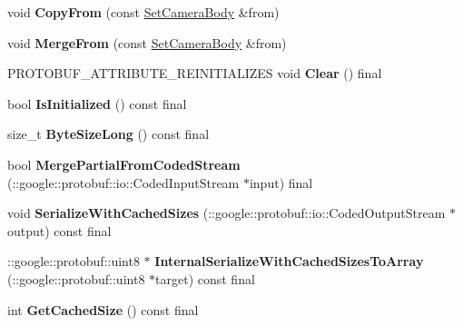 \begin{DoxyCompactItemize}
void {\bfseries Copy\+From} (const \hyperlink{classtbBasics_1_1SetCameraBody}{Set\+Camera\+Body} \&from)
\item 
\mbox{\label{classtbBasics_1_1SetCameraBody_aa9338e7e38bf2cf49025dcf941282426}} 
void {\bfseries Merge\+From} (const \hyperlink{classtbBasics_1_1SetCameraBody}{Set\+Camera\+Body} \&from)
\item 
\mbox{\label{classtbBasics_1_1SetCameraBody_a5fdb43490562eb458074dc9f41065b80}} 
P\+R\+O\+T\+O\+B\+U\+F\+\_\+\+A\+T\+T\+R\+I\+B\+U\+T\+E\+\_\+\+R\+E\+I\+N\+I\+T\+I\+A\+L\+I\+Z\+ES void {\bfseries Clear} () final
\item 
\mbox{\label{classtbBasics_1_1SetCameraBody_ae55cc5c44cdcf215ed811c48ea5206d5}} 
bool {\bfseries Is\+Initialized} () const final
\item 
\mbox{\label{classtbBasics_1_1SetCameraBody_a6523e93895c9e378e550adeae2d84d6a}} 
size\+\_\+t {\bfseries Byte\+Size\+Long} () const final
\item 
\mbox{\label{classtbBasics_1_1SetCameraBody_a402da68226250d67e15501ccfa576054}} 
bool {\bfseries Merge\+Partial\+From\+Coded\+Stream} (\+::google\+::protobuf\+::io\+::\+Coded\+Input\+Stream $\ast$input) final
\item 
\mbox{\label{classtbBasics_1_1SetCameraBody_a2122325ce640fad073fd3ced8d68f975}} 
void {\bfseries Serialize\+With\+Cached\+Sizes} (\+::google\+::protobuf\+::io\+::\+Coded\+Output\+Stream $\ast$output) const final
\item 
\mbox{\label{classtbBasics_1_1SetCameraBody_a73d90d06f1dc72a3f111898eb19f5676}} 
\+::google\+::protobuf\+::uint8 $\ast$ {\bfseries Internal\+Serialize\+With\+Cached\+Sizes\+To\+Array} (\+::google\+::protobuf\+::uint8 $\ast$target) const final
\item 
\mbox{\label{classtbBasics_1_1SetCameraBody_af2da0bfaac0e6feab4688408a36dc516}} 
int {\bfseries Get\+Cached\+Size} () const final
\item 

\end{DoxyCompactItemize}
